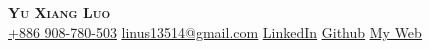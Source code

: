 \begin{center}
    \textbf{\Huge \scshape Yu Xiang Luo} \\ \vspace{1pt}
	\href{tel:+886 908-780-503}{ \underline{+886 908-780-503}} \quad
    \href{mailto:linus13514@gmail.com}{ \underline{linus13514@gmail.com}} \quad
    \href{https://www.linkedin.com/in/yu-xiang-luo-116793269/}{ \underline{LinkedIn}} \quad
    \href{https://github.com/YuXiangLo}{ \underline{Github}} \quad
	\href{https://yuxianglo.github.io}{ \underline{My Web}}
\end{center}
